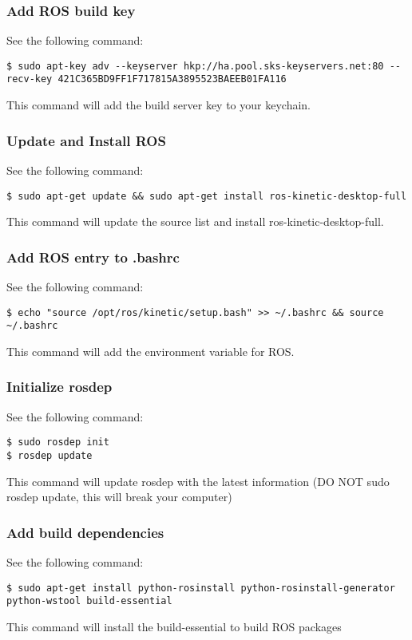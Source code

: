 \subsubsection{Add ROS build key}
\noindent See the following command:
\begin{lstlisting}[breaklines=True language=bash]
$ sudo apt-key adv --keyserver hkp://ha.pool.sks-keyservers.net:80 --recv-key 421C365BD9FF1F717815A3895523BAEEB01FA116
\end{lstlisting}

\noindent This command will add the build server key to your keychain.

\subsubsection{Update and Install ROS}
\noindent See the following command:
\begin{lstlisting}[breaklines=true language=bash]
$ sudo apt-get update && sudo apt-get install ros-kinetic-desktop-full
\end{lstlisting}
\noindent This command will update the source list and install ros-kinetic-desktop-full.

\subsubsection{Add ROS entry to .bashrc}
\noindent See the following command:
\begin{lstlisting}[breaklines=True language=bash]
$ echo "source /opt/ros/kinetic/setup.bash" >> ~/.bashrc && source ~/.bashrc
\end{lstlisting}
\noindent This command will add the environment variable for ROS.

\subsubsection{Initialize rosdep}
\noindent See the following command:
\begin{lstlisting}[breaklines=True language=bash]
$ sudo rosdep init
$ rosdep update
\end{lstlisting}
\noindent This command will update rosdep with the latest information (DO NOT sudo rosdep update, this will break your computer)

\subsubsection{Add build dependencies}
\noindent See the following command:
\begin{lstlisting}[breaklines=True language=bash]
$ sudo apt-get install python-rosinstall python-rosinstall-generator python-wstool build-essential
\end{lstlisting}
\noindent This command will install the build-essential to build ROS packages

